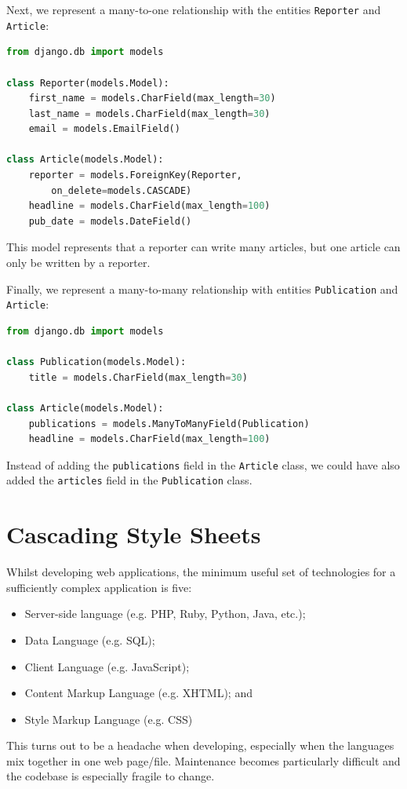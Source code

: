 \documentclass[a4paper, openany]{memoir}
\begin{document}
\noindent Next, we represent a many-to-one relationship with the entities \texttt{Reporter} and \texttt{Article}:
\begin{lstlisting}[language=python]
from django.db import models

class Reporter(models.Model):
    first_name = models.CharField(max_length=30)
    last_name = models.CharField(max_length=30)
    email = models.EmailField()
    
class Article(models.Model):
    reporter = models.ForeignKey(Reporter, 
        on_delete=models.CASCADE)
    headline = models.CharField(max_length=100)
    pub_date = models.DateField()
\end{lstlisting}
This model represents that a reporter can write many articles, but one article can only be written by a reporter.

\noindent Finally, we represent a many-to-many relationship with entities \texttt{Publication} and \texttt{Article}:
\begin{lstlisting}[language=python]
from django.db import models

class Publication(models.Model):
    title = models.CharField(max_length=30)

class Article(models.Model):
    publications = models.ManyToManyField(Publication)
    headline = models.CharField(max_length=100)
\end{lstlisting}
Instead of adding the \texttt{publications} field in the \texttt{Article} class, we could have also added the \texttt{articles} field in the \texttt{Publication} class.
\newpage

\section{Cascading Style Sheets}
Whilst developing web applications, the minimum useful set of technologies for a sufficiently complex application is five:
\begin{itemize}
    \item Server-side language (e.g. PHP, Ruby, Python, Java, etc.);
    \item Data Language (e.g. SQL);
    \item Client Language (e.g. JavaScript);
    \item Content Markup Language (e.g. XHTML); and
    \item Style Markup Language (e.g. CSS)
\end{itemize}
This turns out to be a headache when developing, especially when the languages mix together in one web page/file. Maintenance becomes particularly difficult and the codebase is especially fragile to change.
\end{document}

